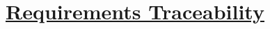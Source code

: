 \section[Requirements Traceability]{\hyperlink{toc}{Requirements Traceability}}
	\label{sec:requirementsTraceability}

